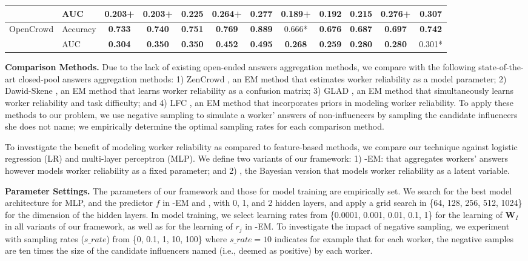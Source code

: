 \begin{table}[t]
\begin{tabular}{ll|ccccc|ccccc}
                             & AUC   & 0.203+         & 0.203+         & 0.225          & 0.264+         & 0.277          & 0.189+         & 0.192          & 0.215          & 0.276+         & \textbf{0.307}         \\ \hline
\multirow{2}{*}{OpenCrowd}   & Accuracy     & \textbf{0.733} & \textbf{0.740} & \textbf{0.751}         & \textbf{0.769} & \textbf{0.889}  & 0.666* & \textbf{0.676} &\textbf{0.687}         & \textbf{0.697}         & \textbf{0.742} \\ %
                             & AUC   & \textbf{0.304} & \textbf{0.350} & \textbf{0.350} & \textbf{0.452} & \textbf{0.495} & \textbf{0.268} & \textbf{0.259} & \textbf{0.280} & \textbf{0.280}  &  0.301*\\ \bottomrule
\end{tabular}
 \label{sec:compres}  
\end{table}

\smallskip
\noindent\textbf{Comparison Methods.} Due to the lack of existing open-ended answers aggregation methods, we compare with the following state-of-the-art closed-pool answers aggregation methods: 1) ZenCrowd \cite{demartini2012zencrowd}, an EM method that estimates worker reliability as a model parameter; 2) Dawid-Skene \cite{dawid1979maximum}, an EM method that learns worker reliability as a confusion matrix; 3) GLAD \cite{whitehill2009whose}, an EM method that simultaneously learns worker reliability and task difficulty; and 4) LFC \cite{raykar2010learning}, an EM method 
that incorporates priors in modeling worker reliability. To apply these methods to our problem, we use negative sampling to simulate a worker' answers of non-influencers by sampling the candidate influencers she does not name; we empirically determine the optimal sampling rates for each comparison method. 

To investigate the benefit of modeling worker reliability as compared to feature-based methods, we compare our technique against logistic regression (LR) and multi-layer perceptron (MLP). We define two variants of our framework: 1) \sys-EM: \sys that aggregates workers' answers however models worker reliability as a fixed parameter; and 2) \sys, the Bayesian version that models worker reliability as a latent variable.




\smallskip
\noindent\textbf{Parameter Settings.} The parameters of our framework and those for model training are empirically set. We search for the best model architecture for MLP, and the predictor $f$ in \sys-EM and \sys, with 0, 1, and 2 hidden layers, and apply a grid search in \{64, 128, 256, 512, 1024\} for the dimension of the hidden layers. In model training, we select learning rates from \{0.0001, 0.001, 0.01, 0.1, 1\} for the learning of $\mathbf{W}_I$ in all variants of our framework, as well as for the learning of $r_j$ in \sys-EM. To investigate the impact of negative sampling, we experiment with sampling rates ($s\_rate$) from \{0, 0.1, 1, 10, 100\} where $s\_rate=10$ indicates for example that for each worker, the negative samples are ten times the size of the candidate influencers named (i.e., deemed as positive) by each worker.

